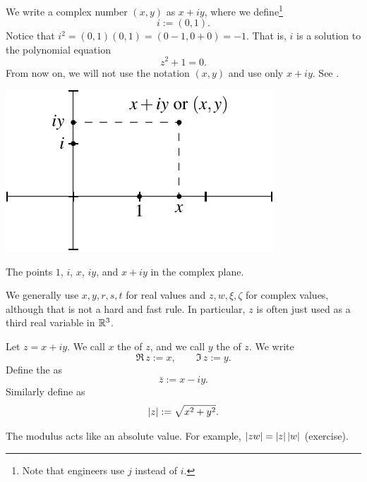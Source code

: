 We write a complex number $(x,y)$ as $x+iy$, where we
define\footnote{Note that engineers use $j$ instead of $i$.}
\begin{equation*}
i := (0,1) .
\end{equation*}
Notice that $i^2 = (0,1)(0,1) = (0-1,0+0) = -1$.
That is, $i$ is a solution to the polynomial equation
\begin{equation*}
z^2+1=0 .
\end{equation*}
From now on, we will not use the notation $(x,y)$ and use only $x+iy$.
See .
\begin{myfigureht}
\includegraphics{figures/complexplane}
\caption{The points $1$, $i$, $x$, $iy$, and $x+iy$ in the complex
plane.\label{fig:complexplane}}
\end{myfigureht}

We generally use $x,y,r,s,t$ for real values and $z,w,\xi,\zeta$
for complex values, although that is not a hard and fast rule.  In
particular, $z$ is often just used as a third real variable in ${\mathbb{R}}^3$.

\begin{defn}
Let $z= x+iy$.
We call $x$ 
the \emph{} of $z$, and 
we call $y$
the \emph{} of $z$.  We write
\begin{equation*}
\Re\, z := x , \qquad
\Im\, z := y .
\end{equation*}
Define the
\emph{} as
\begin{equation*}
\bar{z} := x-iy .
\end{equation*}
Similarly define \emph{} as
\begin{equation*}
\lvert {z} \rvert := \sqrt{x^2+y^2} .
\end{equation*}
\end{defn}
The modulus acts like an absolute value.  For example,
$\lvert {zw} \rvert = \lvert {z} \rvert \, \lvert {w} \rvert$ (exercise).

